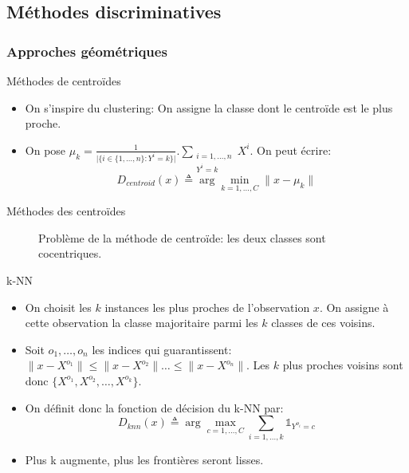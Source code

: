 \documentclass[8pt]{beamer}
\begin{document}
		\subsection{Méthodes discriminatives}
			\subsubsection{Approches géométriques}
				\begin{frame}{Méthodes de centroïdes}
					\begin{itemize}
						\item<1-> On s'inspire du clustering: On assigne la classe dont le centroïde est le plus proche.
						\item<2-> On pose \(\mu_k = \frac{1}{\vert \{i\in\{1,\dots,n\}: Y^i = k\} \vert}.\sum_{\substack{i=1,\dots,n\\Y^i = k}} X^i\). On peut écrire:
							\begin{equation}
								D_{centroid}(x) \triangleq \arg \min_{k=1,\dots,C} \lVert x - \mu_k \rVert
							\end{equation}
					\end{itemize}
				\end{frame}
				\begin{frame}{Méthodes des centroïdes}
					\begin{figure}[H]
						
						\caption*{Problème de la méthode de centroïde: les deux classes sont cocentriques.}
					\end{figure}
				\end{frame}
				\begin{frame}{k-NN}
					\begin{itemize}
						\item<1-> On choisit les \(k\) instances les plus proches de l'observation \(x\). On assigne à cette observation la classe majoritaire parmi les \(k\) classes de ces voisins.
						\item<2-> Soit \(o_1,\dots,o_n\) les indices qui guarantissent: \(\lVert x - X^{o_1} \rVert \leq \lVert x - X^{o_2} \rVert \dots \leq \lVert x - X^{o_n} \rVert\). Les \(k\) plus proches voisins sont donc \(\{X^{o_1}, X^{o_2},\dots,X^{o_k}\}\).
						\item<3-> On définit donc la fonction de décision du k-NN par:
							\begin{equation}
								D_{knn}(x) \triangleq \arg \max_{c=1,\dots,C} \sum_{i=1,\dots,k} \mathbb{1}_{Y^{o_i} = c}
							\end{equation}
						\item<4-> Plus k augmente, plus les frontières seront lisses.
					\end{itemize}
				\end{frame}
\end{document}
